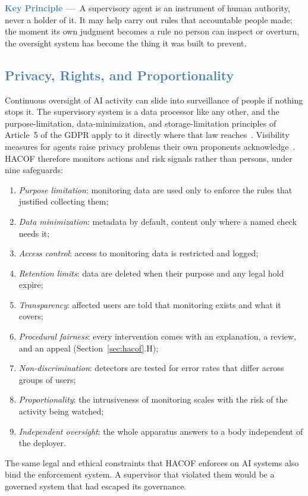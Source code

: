 \documentclass[journal]{IEEEtran}
\newcommand{\hacof}{HACOF}
\begin{document}
\begin{mdframed}[linecolor=steelblue, linewidth=1.2pt, backgroundcolor=steelblue!6,
  innerleftmargin=8pt, innerrightmargin=8pt, innertopmargin=6pt, innerbottommargin=6pt,
  roundcorner=4pt]
\noindent\textcolor{steelblue}{\bfseries Key Principle ---}~A supervisory agent is an instrument of human authority, never a holder of it. It may help carry out rules that accountable people made; the moment its own judgment becomes a rule no person can inspect or overturn, the oversight system has become the thing it was built to prevent.
\end{mdframed}

\subsection{\textcolor{steelblue}{Privacy, Rights, and Proportionality}}
\label{sec:hacof-privacy}

Continuous oversight of AI activity can slide into surveillance of people if nothing stops it. The supervisory system is a data processor like any other, and the purpose-limitation, data-minimization, and storage-limitation principles of Article~5 of the GDPR apply to it directly where that law reaches~\cite{gdpr2016}.
Visibility measures for agents raise privacy problems their own proponents acknowledge~\cite{chan2024visibility}.
\hacof{} therefore monitors actions and risk signals rather than persons, under nine safeguards:
\begin{enumerate}
  \item \textit{Purpose limitation}: monitoring data are used only to enforce the rules that justified collecting them;
  \item \textit{Data minimization}: metadata by default, content only where a named check needs it;
  \item \textit{Access control}: access to monitoring data is restricted and logged;
  \item \textit{Retention limits}: data are deleted when their purpose and any legal hold expire;
  \item \textit{Transparency}: affected users are told that monitoring exists and what it covers;
  \item \textit{Procedural fairness}: every intervention comes with an explanation, a review, and an appeal (Section~\ref{sec:hacof}.H);
  \item \textit{Non-discrimination}: detectors are tested for error rates that differ across groups of users;
  \item \textit{Proportionality}: the intrusiveness of monitoring scales with the risk of the activity being watched;
  \item \textit{Independent oversight}: the whole apparatus answers to a body independent of the deployer.
\end{enumerate}
The same legal and ethical constraints that \hacof{} enforces on AI systems also bind the enforcement system. A supervisor that violated them would be a governed system that had escaped its governance.
\end{document}
